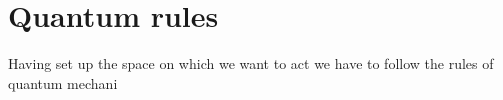 \section{Quantum rules}
Having set up the space on which we want to act we have to follow the rules of quantum mechani